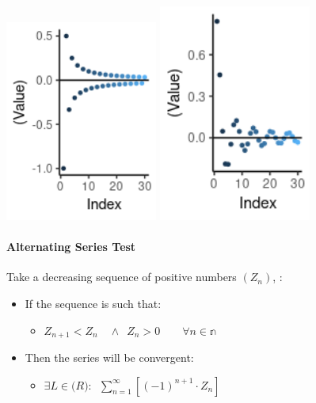 \documentclass[class=article, crop=false]{standalone}
\begin{document}
\includegraphics[width=5cm]{media/InfSeries/Rplot.png}
\includegraphics[width=5cm]{media/InfSeries/Rplot01.png}

\hypertarget{header-n3292}{%
\paragraph{Alternating Series Test}\label{header-n3292}}

Take a decreasing sequence of positive numbers \((Z_n)\), :

\begin{itemize}
\item
  If the sequence is such that:

  \begin{itemize}
  \item
    \(Z_{n+1} < Z_n \enspace  \enspace \wedge \enspace Z_n > 0 \qquad \forall n \in \mathbb{n}\)
  \end{itemize}
\item
  Then the series will be convergent:

  \begin{itemize}
  \item
    \(\exists L \in \mathbb(R): \enspace \sum^\infty_{n=1} \left[ (-1)^{n+1} \cdot Z_n \right]\)
  \end{itemize}
\end{itemize}
\end{document}
